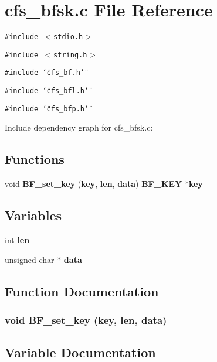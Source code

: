 \section{cfs\_\-bfsk.c File Reference}
\label{cfs__bfsk_8c}


{\tt \#include $<$stdio.h$>$}\par
{\tt \#include $<$string.h$>$}\par
{\tt \#include \char`\"{}cfs\_\-bf.h\char`\"{}}\par
{\tt \#include \char`\"{}cfs\_\-bfl.h\char`\"{}}\par
{\tt \#include \char`\"{}cfs\_\-bfp.h\char`\"{}}\par


Include dependency graph for cfs\_\-bfsk.c:\subsection*{Functions}
\begin{CompactItemize}
\item 
void {\bf BF\_\-set\_\-key} ({\bf key}, {\bf len}, {\bf data}) {\bf BF\_\-KEY} $\ast${\bf key}
\end{CompactItemize}
\subsection*{Variables}
\begin{CompactItemize}
\item 
int {\bf len}
\item 
unsigned char $\ast$ {\bf data}
\end{CompactItemize}


\subsection{Function Documentation}
\subsubsection{\setlength{\rightskip}{0pt plus 5cm}void BF\_\-set\_\-key ({\bf key}, {\bf len}, {\bf data})}\label{cfs__bfsk_8c_a2}




\subsection{Variable Documentation}
